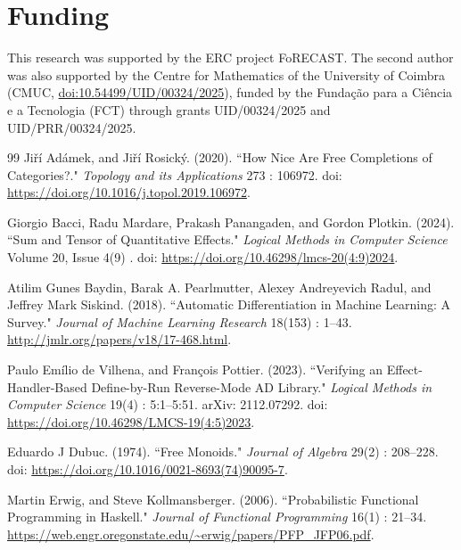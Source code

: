 \documentclass[11pt,a4paper]{article}
\theoremstyle{definition}
\theoremstyle{remark}
\begin{document}
\section*{Funding}

This research was supported by the ERC project FoRECAST. The second author was
also supported by the Centre for Mathematics of the University of Coimbra
(CMUC, \href{https://doi.org/10.54499/UID/00324/2025}{doi:10.54499/UID/00324/2025}),
funded by the Funda\c{c}\~ao para a Ci\^encia e a Tecnologia (FCT) through
grants UID/00324/2025 and UID/PRR/00324/2025.

\begin{thebibliography}{99}
Jiří Adámek, and Jiří Rosický. (2020). ``How Nice Are Free Completions of Categories?." \emph{Topology and its Applications} 273 : 106972. doi: \url{https://doi.org/10.1016/j.topol.2019.106972}.

Giorgio Bacci, Radu Mardare, Prakash Panangaden, and Gordon Plotkin. (2024). ``Sum and Tensor of Quantitative Effects." \emph{Logical Methods in Computer Science} Volume 20, Issue 4(9) . doi: \url{https://doi.org/10.46298/lmcs-20(4:9)2024}.

Atilim Gunes Baydin, Barak A. Pearlmutter, Alexey Andreyevich Radul, and Jeffrey Mark Siskind. (2018). ``Automatic Differentiation in Machine Learning: A Survey." \emph{Journal of Machine Learning Research} 18(153) : 1--43. \url{http://jmlr.org/papers/v18/17-468.html}.

Paulo Emílio de Vilhena, and François Pottier. (2023). ``Verifying an Effect-Handler-Based Define-by-Run Reverse-Mode AD Library." \emph{Logical Methods in Computer Science} 19(4) : 5:1--5:51. arXiv: 2112.07292. doi: \url{https://doi.org/10.46298/LMCS-19(4:5)2023}.

Eduardo J Dubuc. (1974). ``Free Monoids." \emph{Journal of Algebra} 29(2) : 208--228. doi: \url{https://doi.org/10.1016/0021-8693(74)90095-7}.

Martin Erwig, and Steve Kollmansberger. (2006). ``Probabilistic Functional Programming in Haskell." \emph{Journal of Functional Programming} 16(1) : 21--34. \url{https://web.engr.oregonstate.edu/~erwig/papers/PFP_JFP06.pdf}.


\end{thebibliography}
\end{document}
